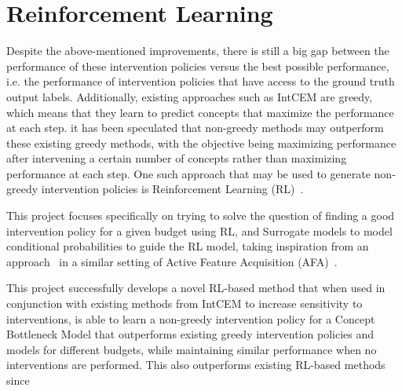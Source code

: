 \documentclass[../main.tex]{subfiles}
\begin{document}
\section{Reinforcement Learning}
Despite the above-mentioned improvements, there is still a big gap between the
performance
of these intervention policies versus the best possible performance, i.e. the performance of 
intervention policies that have access to the ground truth output labels.
Additionally, existing approaches such as IntCEM are greedy, which means that
they learn to predict concepts that maximize the performance at each step.
it has been speculated that non-greedy methods may outperform 
these existing greedy methods, with the objective being maximizing 
performance after intervening a certain number of concepts rather than maximizing 
performance at each step. 
One such approach that may be used to generate non-greedy intervention policies 
is Reinforcement Learning (RL)~\cite{rl}.

This project focuses specifically on trying to solve the 
question of finding a good intervention policy for a given 
budget using RL, and Surrogate models to model conditional 
probabilities to guide the RL model, taking inspiration
from an approach~\cite{gsmrl} in a similar setting of
Active Feature Acquisition (AFA)~\cite{afa}.

This project successfully develops a novel RL-based method
that when used in conjunction with
existing methods from IntCEM to increase sensitivity
to interventions, is able to learn a non-greedy intervention policy
for a Concept Bottleneck Model that outperforms
existing 
greedy intervention policies and models
for different budgets, while maintaining similar performance
when no interventions are performed. This also outperforms existing RL-based methods since 
\end{document}
